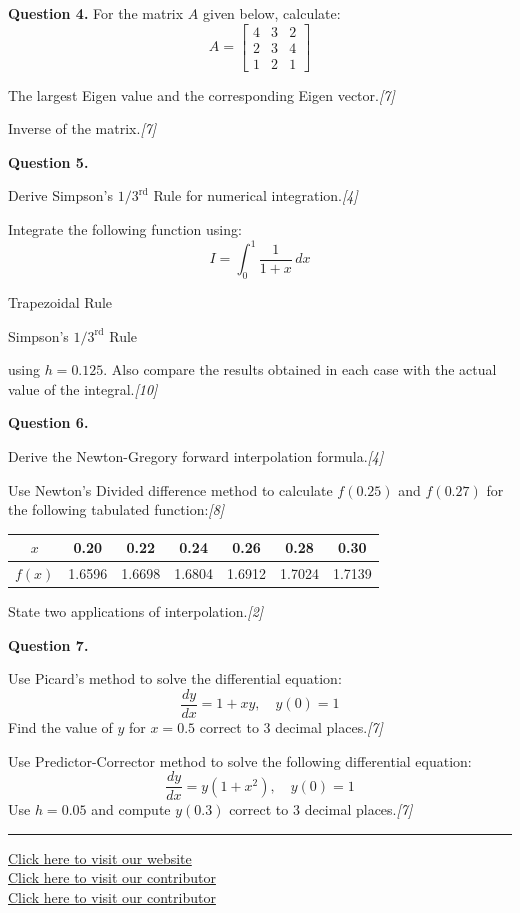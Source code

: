 \documentclass[11pt,a4paper]{article}
\newcommand{\pts}[1]{\hfill\textit{[#1]}}
\begin{document}
\medskip\noindent\textbf{Question 4.} For the matrix $A$ given below, calculate:
\[ A = \begin{bmatrix} 4 & 3 & 2 \\ 2 & 3 & 4 \\ 1 & 2 & 1 \end{bmatrix} \]
\begin{parts}
  \item The largest Eigen value and the corresponding Eigen vector.\pts{7}
  \item Inverse of the matrix.\pts{7}
\end{parts}

\medskip\noindent\textbf{Question 5.}
\begin{parts}
  \item Derive Simpson's $1/3^{\text{rd}}$ Rule for numerical integration.\pts{4}
  \item Integrate the following function using:
  \[ I = \int_{0}^{1} \frac{1}{1+x} \, dx \]
  \begin{parts}
    \item Trapezoidal Rule
    \item Simpson's $1/3^{\text{rd}}$ Rule
  \end{parts}
  using $h = 0.125$. Also compare the results obtained in each case with the actual value of the integral.\pts{10}
\end{parts}

\medskip\noindent\textbf{Question 6.}
\begin{parts}
  \item Derive the Newton-Gregory forward interpolation formula.\pts{4}
  \item Use Newton's Divided difference method to calculate $f(0.25)$ and $f(0.27)$ for the following tabulated function:\pts{8}
  \begin{center}
  \begin{tabular}{|c|c|c|c|c|c|c|}
    \hline
    $x$ & 0.20 & 0.22 & 0.24 & 0.26 & 0.28 & 0.30 \\
    \hline
    $f(x)$ & 1.6596 & 1.6698 & 1.6804 & 1.6912 & 1.7024 & 1.7139 \\
    \hline
  \end{tabular}
  \end{center}
  \item State two applications of interpolation.\pts{2}
\end{parts}

\medskip\noindent\textbf{Question 7.}
\begin{parts}
  \item Use Picard's method to solve the differential equation:
  \[ \frac{dy}{dx} = 1 + xy, \quad y(0) = 1 \]
  Find the value of $y$ for $x = 0.5$ correct to 3 decimal places.\pts{7}
  \item Use Predictor-Corrector method to solve the following differential equation:
  \[ \frac{dy}{dx} = y(1 + x^2), \quad y(0) = 1 \]
  Use $h = 0.05$ and compute $y(0.3)$ correct to 3 decimal places.\pts{7}
\end{parts}

\vfill
\rule{\linewidth}{0.4pt}
\begin{center}\small
\href{https://bhu-exam.vercel.app/}{Click here to visit our website}\\[4pt]\href{https://me-aryan.vercel.app/}{Click here to visit our contributor}\\[4pt]\href{https://quashan-me.vercel.app/}{Click here to visit our contributor}
\end{center}
\end{document}
